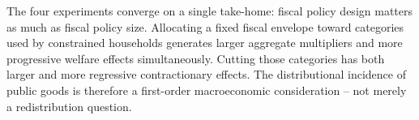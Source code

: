 The four experiments converge on a single take-home: fiscal policy design
matters as much as fiscal policy size. Allocating a fixed fiscal envelope
toward categories used by constrained households generates larger aggregate
multipliers and more progressive welfare effects simultaneously. Cutting those
categories has both larger and more regressive contractionary effects. The
distributional incidence of public goods is therefore a first-order
macroeconomic consideration -- not merely a redistribution question.
